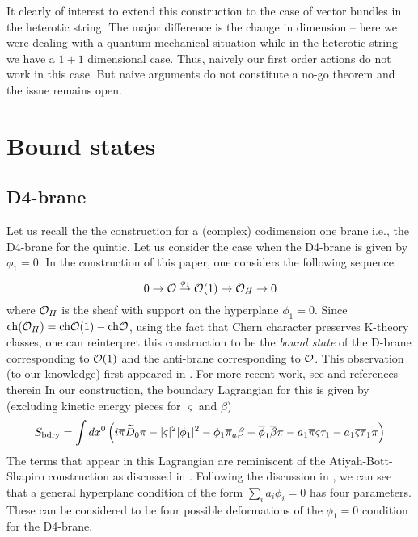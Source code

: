 \documentclass[a4paper,12pt]{article}
\begin{document}
It clearly of interest to extend this construction to
the case of vector bundles in the heterotic string. The major difference
is the change in dimension -- here we were dealing with a quantum
mechanical situation while in the heterotic string
we have a $1+1$ dimensional case. Thus, naively our first order actions
do not work in this case. But naive arguments do not constitute a no-go
theorem and the issue remains open. 


\section{Bound states}

\subsection{D4-brane}

Let us recall the the construction for a (complex) codimension one brane
i.e., the D4-brane for the quintic. 
Let us consider the case when the D4-brane is given
by $\phi_1=0$. In the construction of this paper, one considers the
following sequence
\begin{equation}
0\rightarrow {\cal O} \stackrel{\phi_1}{\rightarrow}{\cal
O}(1)\rightarrow {\cal O}_H \rightarrow 0
\end{equation}
where ${\cal O}_H$ is the sheaf with support on the hyperplane
$\phi_1=0$.  Since ${\rm ch}({\cal O}_H) = {\rm ch} {\cal O}(1)- {\rm ch}
{\cal O}$, using the fact that Chern character preserves K-theory classes,
one can reinterpret this construction to be the {\em bound state}
of the D-brane corresponding to ${\cal O}(1)$ and the anti-brane
corresponding to ${\cal O}$.  This observation (to our knowledge) first
appeared in \cite{bpsalgebra}. For more recent work, see 
\cite{Kutasov:2000aq,Kraus:2000nj,hori} and references therein
In our construction, the boundary Lagrangian for this is
given by (excluding kinetic energy pieces for $\varsigma$ and $\beta$)
\begin{equation}
S_{\rm bdry} = \int dx^0 \left(
i\overline{\pi}\widetilde{D}_0 \pi - 
|\varsigma|^2|\phi_1|^2 
- \phi_1\overline{\pi}_a \beta
- \overline{\phi}_1 \overline{\beta} \pi
- a_1 \overline{\pi}
\varsigma\tau_1
- a_1 \overline{\varsigma}
\overline{\tau}_1 \pi \right)
\end{equation}
The terms that appear in this Lagrangian are reminiscent of the
Atiyah-Bott-Shapiro construction as discussed in 
\cite{Kutasov:2000aq,Kraus:2000nj,hori}. Following the discussion
in \cite{quintic}, we can see that a general hyperplane condition
of the form $\sum_i a_i\phi_i=0$ has four parameters. These can
be considered to be four possible deformations of the $\phi_1=0$
condition for the D4-brane.
\end{document}
